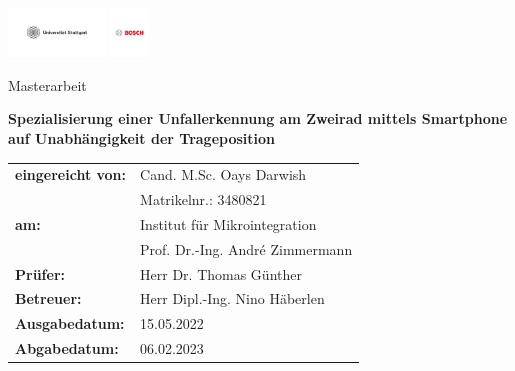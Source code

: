 \relax
\begin{center}
	\begin{center}
			\includegraphics[height=1.3cm]{Bilder/Logos/unistuttgart_logo_deutsch2.pdf} \hfill \includegraphics[height=1.3cm]{Bilder/Logos/BoschLogotype2.pdf}
	\end{center}
	\vspace*{2.5cm} 
		
	\begin{center}
		\LARGE{Masterarbeit}
	\end{center}
	\vspace{0.5cm}
	\begin{center}
		\LARGE\textbf{Spezialisierung einer Unfallerkennung am Zweirad mittels Smartphone auf Unabhängigkeit der Trageposition}
	\end{center}
	\vspace{2cm}
	\begin{center}
		\begin{tabular}{ll}
			\textbf{eingereicht von:}& Cand. M.Sc. Oays Darwish\\
			& Matrikelnr.: 3480821\\[+2.5em]
			\textbf{am:} & Institut für Mikrointegration \\
			& Prof. Dr.-Ing. André Zimmermann \\[+13em]
			\textbf{Prüfer:} & Herr Dr. Thomas Günther\\
			\textbf{Betreuer:} & Herr Dipl.-Ing. Nino Häberlen \\[+2.5em]
			\textbf{Ausgabedatum:} & 15.05.2022\\
			\textbf{Abgabedatum:} & 06.02.2023\\
		\end{tabular}
	\end{center}	
%		

\end{center}
